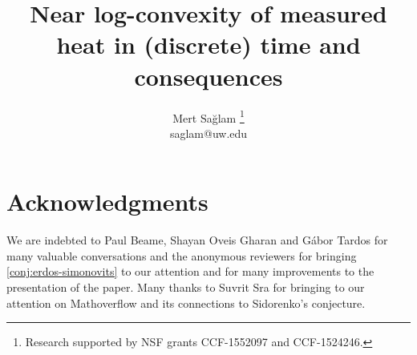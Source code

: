 \documentclass[10pt,letterpaper]{article}
\begin{document}
\title{\bf\fontsize{15}{19}\selectfont
  Near log-convexity of measured heat in
  (discrete) time and consequences}
\author{%
  \vspace{-0.5em}\fontsize{10}{10}\selectfont Mert Sağlam%
  \thanks{Research supported by NSF grants CCF-1552097 and CCF-1524246.}\\
  \vspace{-0.5em}\fontsize{09}{09}\selectfont saglam@uw.edu
}
\date{}
\maketitle
\vspace{-25px}


\tableofcontents
\newpage







\section*{Acknowledgments}
We are indebted to Paul Beame, 
Shayan Oveis Gharan and Gábor Tardos for many valuable
conversations and the anonymous reviewers for bringing 
\autoref{conj:erdos-simonovits} to our attention and for
many improvements to the presentation of the paper. 
Many thanks to Suvrit Sra for bringing \cite{Pate2012} 
to our attention on Mathoverflow \cite{Sra2016} and 
its connections to Sidorenko's conjecture.
\printbibliography
\end{document}
